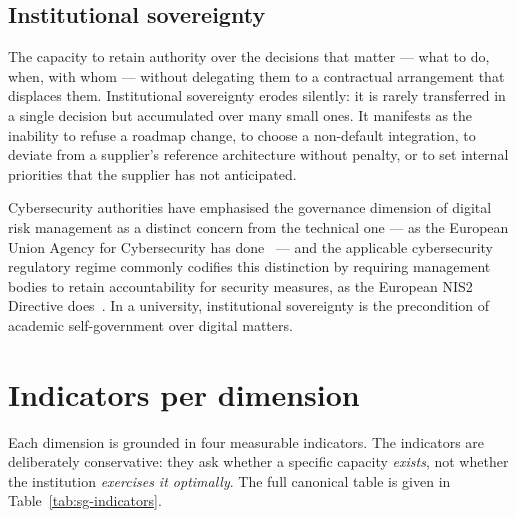 \subsection{Institutional sovereignty}
\label{sec:sg-institutional}

The capacity to retain authority over the decisions that matter ---
what to do, when, with whom --- without delegating them to a contractual
arrangement that displaces them. Institutional sovereignty erodes
silently: it is rarely transferred in a single decision but accumulated
over many small ones. It manifests as the inability to refuse a
roadmap change, to choose a non-default integration, to deviate from
a supplier's reference architecture without penalty, or to set internal
priorities that the supplier has not anticipated.

Cybersecurity authorities have emphasised the governance dimension of
digital risk management as a distinct concern from the technical one
--- as the European Union Agency for Cybersecurity has
done~\cite{enisa-risk} --- and the applicable cybersecurity regulatory
regime commonly codifies this distinction by requiring management
bodies to retain accountability for security measures, as the European
NIS2 Directive does~\cite{nis2}. In a university, institutional
sovereignty is the precondition of academic self-government over
digital matters.

\section{Indicators per dimension}
\label{sec:sg-indicators}

Each dimension is grounded in four measurable indicators. The
indicators are deliberately conservative: they ask whether a specific
capacity \emph{exists}, not whether the institution \emph{exercises it
optimally}. The full canonical table is given in
Table~\ref{tab:sg-indicators}.

